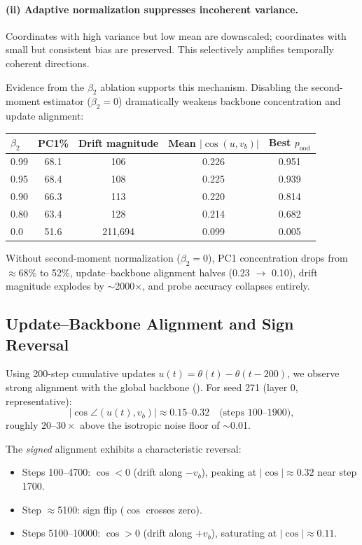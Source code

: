 \documentclass[11pt,a4paper]{article}
\begin{document}
\paragraph{(ii) Adaptive normalization suppresses incoherent variance.} Coordinates with high variance but low mean are downscaled; coordinates with small but consistent bias are preserved. This selectively amplifies temporally coherent directions.

Evidence from the $\beta_2$ ablation supports this mechanism. Disabling the second-moment estimator ($\beta_2 = 0$) dramatically weakens backbone concentration and update alignment:

\begin{center}
\begin{tabular}{lcccc}
\toprule
$\beta_2$ & PC1\% & Drift magnitude & Mean $|\cos(u, v_b)|$ & Best $p_{\mathrm{ood}}$ \\
\midrule
0.99 & 68.1 & 106 & 0.226 & 0.951 \\
0.95 & 68.4 & 108 & 0.225 & 0.939 \\
0.90 & 66.3 & 113 & 0.220 & 0.814 \\
0.80 & 63.4 & 128 & 0.214 & 0.682 \\
0.0 & 51.6 & 211{,}694 & 0.099 & 0.005 \\
\bottomrule
\end{tabular}
\end{center}

Without second-moment normalization ($\beta_2 = 0$), PC1 concentration drops from $\approx$68\% to 52\%, update--backbone alignment halves (0.23 $\to$ 0.10), drift magnitude explodes by $\sim$2000$\times$, and probe accuracy collapses entirely.


\subsection{Update--Backbone Alignment and Sign Reversal}\label{sec:update-alignment}

Using 200-step cumulative updates $u(t) = \theta(t) - \theta(t-200)$, we observe strong alignment with the global backbone (). For seed 271 (layer 0, representative):
%
\[
|\cos\angle(u(t), v_b)| \approx 0.15\text{--}0.32 \quad \text{(steps 100--1900)},
\]
%
roughly $20$--$30\times$ above the isotropic noise floor of $\sim$0.01.

The \emph{signed} alignment exhibits a characteristic reversal:
%
\begin{itemize}
\item Steps 100--4700: $\cos < 0$ (drift along $-v_b$), peaking at $|\cos| \approx 0.32$ near step 1700.
\item Step $\approx$5100: sign flip ($\cos$ crosses zero).
\item Steps 5100--10000: $\cos > 0$ (drift along $+v_b$), saturating at $|\cos| \approx 0.11$.
\end{itemize}
\end{document}
